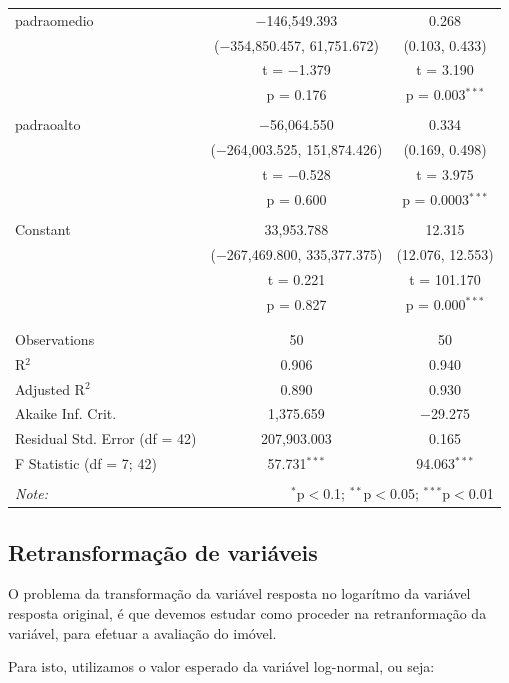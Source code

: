 \documentclass[a4paper]{article}
\begin{document}
\begin{table}[!htbp]
\begin{tabular}{@{\extracolsep{5pt}}lcc}
 padraomedio & $-$146,549.393 & 0.268 \\ 
  & ($-$354,850.457, 61,751.672) & (0.103, 0.433) \\ 
  & t = $-$1.379 & t = 3.190 \\ 
  & p = 0.176 & p = 0.003$^{***}$ \\ 
  & & \\ 
 padraoalto & $-$56,064.550 & 0.334 \\ 
  & ($-$264,003.525, 151,874.426) & (0.169, 0.498) \\ 
  & t = $-$0.528 & t = 3.975 \\ 
  & p = 0.600 & p = 0.0003$^{***}$ \\ 
  & & \\ 
 Constant & 33,953.788 & 12.315 \\ 
  & ($-$267,469.800, 335,377.375) & (12.076, 12.553) \\ 
  & t = 0.221 & t = 101.170 \\ 
  & p = 0.827 & p = 0.000$^{***}$ \\ 
  & & \\ 
\hline \\[-1.8ex] 
Observations & 50 & 50 \\ 
R$^{2}$ & 0.906 & 0.940 \\ 
Adjusted R$^{2}$ & 0.890 & 0.930 \\ 
Akaike Inf. Crit. & 1,375.659 & $-$29.275 \\ 
Residual Std. Error (df = 42) & 207,903.003 & 0.165 \\ 
F Statistic (df = 7; 42) & 57.731$^{***}$ & 94.063$^{***}$ \\ 
\hline 
\hline \\[-1.8ex] 
\textit{Note:}  & \multicolumn{2}{r}{$^{*}$p$<$0.1; $^{**}$p$<$0.05; $^{***}$p$<$0.01} \\ 
\end{tabular} 
\end{table}

\subsection{Retransformação de
variáveis}\label{retransformacao-de-variaveis}

O problema da transformação da variável resposta no logarítmo da
variável resposta original, é que devemos estudar como proceder na
retranformação da variável, para efetuar a avaliação do imóvel.

Para isto, utilizamos o valor esperado da variável log-normal, ou seja:
\end{document}
